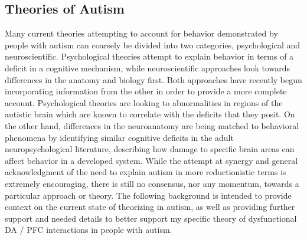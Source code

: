 \documentclass[man]{apa}
\begin{document}
\subsection{Theories of Autism}
Many current theories attempting to account for behavior demonstrated by people with autism can coarsely be divided into two categories, psychological and neuroscientific.  Psychological theories attempt to explain behavior in terms of a deficit in a cognitive mechanism, while neuroscientific approaches look towards differences in the anatomy and biology first.  Both approaches have recently begun incorporating information from the other in order to provide a more complete account.  Psychological theories are looking to abnormalities in regions of the autistic brain which are known to correlate with the deficits that they posit.  On the other hand, differences in the neuroanatomy are being matched to behavioral phenomena by identifying similar cognitive deficits in the adult neuropsychological literature, describing how damage to specific brain areas can affect behavior in a developed system.  While the attempt at synergy and general acknowledgment of the need to explain autism in more reductionistic terms is extremely encouraging, there is still no consensus, nor any momentum, towards a particular approach or theory.  The following background is intended to provide context on the current state of theorizing in autism, as well as providing further support and needed details to better support my specific theory of dysfunctional DA / PFC interactions in people with autism.  
	
\end{document}
